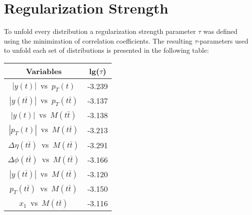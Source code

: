 \chapter{Regularization Strength}\label{appendix:tau}

To unfold every distribution a regularization strength parameter $\tau$ was defined
using the minimization of correlation coefficients\cite{VBlobelT}. The resulting $\tau$-parameters
used to unfold each set of distributions is presented in the following table:

\begin{center}
\begin{tabular}{|c|c|}
\hline
\textbf{Variables} & \textbf{lg($\tau$)} \\
\hline
\hline
$|y(t)|$~vs~$p_{T}(t)$ & -3.239 \\ \hline 
$|y(t\bar{t})|$~vs~$p_{T}(t\bar{t})$ & -3.137 \\ \hline 
$|y(t)|$~vs~$M(t\bar{t})$ & -3.138 \\ \hline 
$|p_{T}(t)|$~vs~$M(t\bar{t})$ & -3.213 \\ \hline 
$\Delta\eta(t\bar{t})$~vs~$M(t\bar{t})$ & -3.291 \\ \hline 
$\Delta\phi(t\bar{t})$~vs~$M(t\bar{t})$ & -3.166 \\ \hline 
$|y(t\bar{t})|$~vs~$M(t\bar{t})$ & -3.120 \\ \hline 
$p_{T}(t\bar{t})$~vs~$M(t\bar{t})$ & -3.150 \\ \hline 
$x_{1}$~vs~$M(t\bar{t})$ & -3.116 \\ \hline 
\end{tabular}
\end{center}